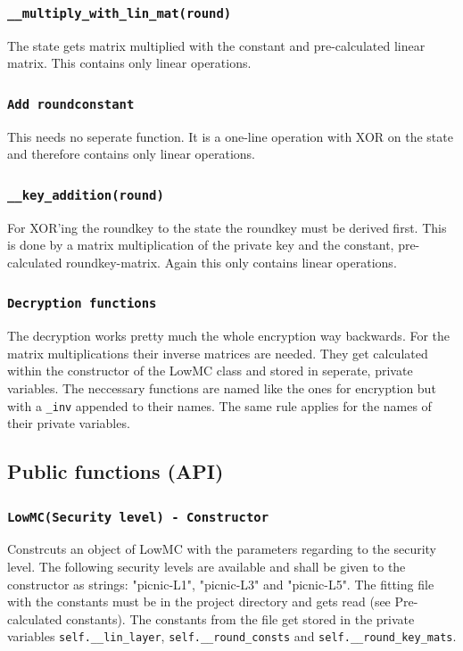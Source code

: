 \documentclass[]{article}
\begin{document}
\subsubsection{\texttt{\_\_multiply\_with\_lin\_mat(round)}}
The state gets matrix multiplied with the constant and pre-calculated linear matrix. This contains only linear operations.
\subsubsection{\texttt{Add roundconstant}}
This needs no seperate function. It is a one-line operation with XOR on the state and therefore contains only linear operations.
\subsubsection{\texttt{\_\_key\_addition(round)}}
For XOR'ing the roundkey to the state the roundkey must be derived first. This is done by a matrix multiplication of the private key and the constant, pre-calculated roundkey-matrix. Again this only contains linear operations. 
\subsubsection{\texttt{Decryption functions}}
The decryption works pretty much the whole encryption way backwards. For the matrix multiplications their inverse matrices are needed. They get calculated within the constructor of the LowMC class and stored in seperate, private variables. The neccessary functions are named like the ones for encryption but with a \texttt{\_inv} appended to their names. The same rule applies for the names of their private variables.
\subsection{Public functions (API)}
\subsubsection{\texttt{LowMC(Security level) - Constructor}}
Constrcuts an object of LowMC with the parameters regarding to the security level. The following security levels are available and shall be given to the constructor as strings: "picnic-L1", "picnic-L3" and "picnic-L5". The fitting file with the constants must be in the project directory and gets read (see Pre-calculated constants). The constants from the file get stored in the private variables \texttt{self.\_\_lin\_layer}, \texttt{self.\_\_round\_consts} and \texttt{self.\_\_round\_key\_mats}.
\end{document}
